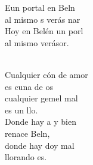 \documentclass[12pt]{article}
\begin{document}
\begin{multicols*}{2}
\begin{cancion}[En un portal][]%
	\begin{chorus}%
	Eun portal  en Beln\\
	al mismo s verás nar \\
	Hoy en Belén un porl \\
	al mismo  verásor.\\
	\end{chorus}%
	\jump\\
	Cualquier cón de amor\\
	es cuna de os\\
	cualquier gemel mal\\
	es un llo.\\
	Donde hay a y bien\\
	renace Beln,\\
	donde hay doy mal\\
	llorando es.\\
\end{cancion}%


\end{multicols*}
\end{document}

